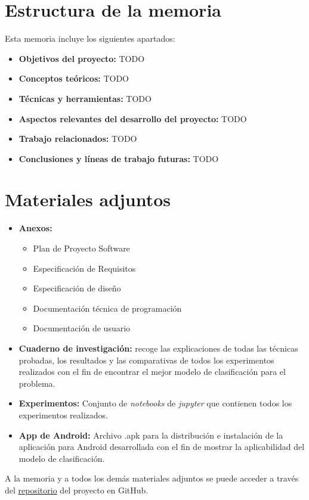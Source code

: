\section{Estructura de la memoria}

Esta memoria incluye los siguientes apartados: 

\begin{itemize}
	\item \textbf{Objetivos del proyecto:}
	TODO
	\item \textbf{Conceptos teóricos:}
	TODO
	\item \textbf{Técnicas y herramientas:}
	TODO
	\item \textbf{Aspectos relevantes del desarrollo del proyecto:}
	TODO
	\item \textbf{Trabajo relacionados:}
	TODO
	\item \textbf{Conclusiones y líneas de trabajo futuras:}
	TODO
\end{itemize}

\section{Materiales adjuntos}

\begin{itemize}	
	\item \textbf{Anexos:}
	\begin{itemize}
		\item Plan de Proyecto Software 
		\item Especificación de Requisitos
		\item Especificación de diseño
		\item Documentación técnica de programación 
		\item Documentación de usuario 
	\end{itemize}
	\item \textbf{Cuaderno de investigación:} recoge las explicaciones de todas las técnicas probadas, los resultados y las comparativas de todos los experimentos realizados con el fin de encontrar el mejor modelo de clasificación para el problema. 
	\item \textbf{Experimentos:} Conjunto de \textit{notebooks} de \textit{jupyter} que contienen todos los experimentos realizados. 
	\item \textbf{App de Android:} Archivo .apk para la distribución e instalación de la aplicación para Android desarrollada con el fin de mostrar la aplicabilidad del modelo de clasificación. 
\end{itemize}

A la memoria y a todos los demás materiales adjuntos se puede acceder a través del \href{https://github.com/aog0036/TFG-SmartBeds}{repositorio} del proyecto en GitHub. 


